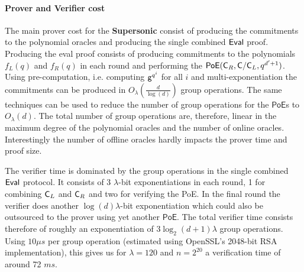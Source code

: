 \paragraph{Prover and Verifier cost}
The main prover cost for the \textsf{\textbf{Supersonic}} consist of producing the commitments to the polynomial oracles and producing the single combined $\textsf{{Eval}}$ proof.
Producing the eval proof consists of producing commitments to the polynomials $f_L(q)$ and $f_R(q)$ in each round and performing the $\textsf{PoE}(\mathsf{C}_R,\mathsf{C}/\mathsf{C}_L,q^{d'+1})$. Using pre-computation, i.e. computing $\mathsf{g}^{q^i}$ for all $i$ and multi-exponentiation the commitments can be produced in $O_\lambda(\frac{d}{\log(d)})$ group operations. The same techniques can be used to reduce the number of group operations for the $\textsf{PoE}$s to $O_\lambda(d)$. The total number of group operations are, therefore, linear in the maximum degree of the polynomial oracles and the number of online oracles. Interestingly the number of offline oracles hardly impacts the prover time and proof size.
 
 The verifier time is dominated by the group operations in the single combined $\textsf{{Eval}}$ protocol.
It consists of 3 $\lambda$-bit exponentiations in each round, 1 for combining $\mathsf{C}_L$ and $\mathsf{C}_R$ and two for verifying the \textsf{PoE}. In the final round the verifier does another $\log(d)\lambda$-bit exponentiation which could also be outsourced to the prover using yet another $\textsf{PoE}$. The total verifier time consists therefore of roughly an exponentiation of $3 \log_2(d+1) \lambda$ group operations. 
Using $10\mu s$ per group operation (estimated using OpenSSL's 2048-bit RSA implementation), this gives us for $\lambda=120$ and $n=2^{20}$ a verification time of around 72 $ms$. 

\vspace{-1em}
